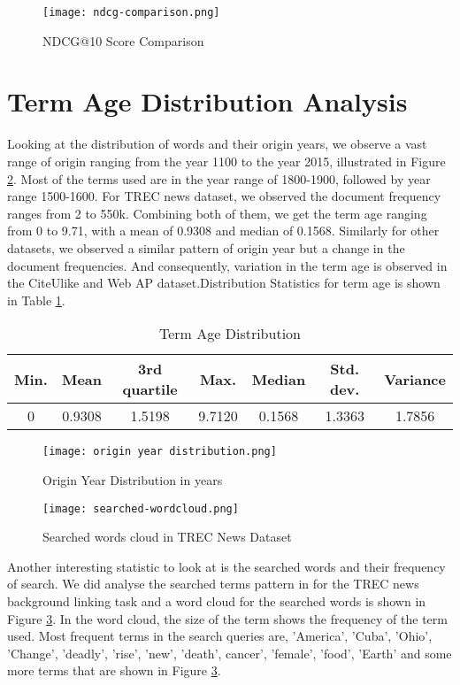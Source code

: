 \begin{figure}
    \centering
    \texttt{[image: ndcg-comparison.png]}
    \caption{NDCG@10 Score Comparison}
    \label{fig:ndcg-scores}
\end{figure}


\section{Term Age Distribution Analysis}
Looking at the distribution of words and their origin years, we observe a vast range of origin ranging from the year 1100 to the year 2015, illustrated in Figure \ref{fig:origin-year-distribution}. Most of the terms used are in the year range of 1800-1900, followed by year range 1500-1600. For TREC news dataset, we observed the document frequency ranges from 2 to 550k. Combining both of them, we get the term age ranging from 0 to 9.71, with a mean of 0.9308 and median of 0.1568. 
Similarly for other datasets, we observed a similar pattern of origin year but a change in the document frequencies. And consequently, variation in the term age is observed in the CiteUlike and Web AP dataset.Distribution Statistics for term age is shown in Table \ref{table:7.1}.

\begin{table}[h!]
\centering
\begin{tabular}{ |c|c|c|c|c|c|c| }
 \hline
 \textbf{Min.}	& \textbf{Mean} & \textbf{3rd quartile} & \textbf{Max.} & \textbf{Median} & \textbf{Std. dev.} & \textbf{Variance}\\
 \hline
 0 & 0.9308 & 1.5198 & 9.7120 & 0.1568 & 1.3363 & 1.7856 \\
\hline
\end{tabular}
\caption{Term Age Distribution}
\label{table:7.1}
\end{table}


\begin{figure}
    \centering
    \texttt{[image: origin year distribution.png]}
    \caption{Origin Year Distribution in years}
    \label{fig:origin-year-distribution}
\end{figure}

\begin{figure}[h!]
    \centering
    \texttt{[image: searched-wordcloud.png]}
    \caption{Searched words cloud in TREC News Dataset}
    \label{fig:search-word-cloud}
\end{figure}

Another interesting statistic to look at is the searched words and their frequency of search. We did analyse the searched terms pattern in for the TREC news background linking task and a word cloud for the searched words is shown in Figure \ref{fig:search-word-cloud}. In the word cloud, the size of the term shows the frequency of the term used. Most frequent terms in the search queries are, 'America', 'Cuba', 'Ohio', 'Change', 'deadly', 'rise', 'new', 'death', cancer', 'female', 'food', 'Earth' and some more terms that are shown in Figure \ref{fig:search-word-cloud}. 